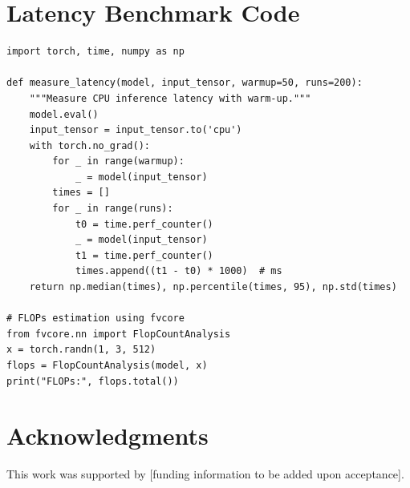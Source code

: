 \documentclass{article}
\begin{document}
\section{Latency Benchmark Code}
\label{app:latency_code}

\begin{verbatim}
import torch, time, numpy as np

def measure_latency(model, input_tensor, warmup=50, runs=200):
    """Measure CPU inference latency with warm-up."""
    model.eval()
    input_tensor = input_tensor.to('cpu')
    with torch.no_grad():
        for _ in range(warmup):
            _ = model(input_tensor)
        times = []
        for _ in range(runs):
            t0 = time.perf_counter()
            _ = model(input_tensor)
            t1 = time.perf_counter()
            times.append((t1 - t0) * 1000)  # ms
    return np.median(times), np.percentile(times, 95), np.std(times)

# FLOPs estimation using fvcore
from fvcore.nn import FlopCountAnalysis
x = torch.randn(1, 3, 512)
flops = FlopCountAnalysis(model, x)
print("FLOPs:", flops.total())
\end{verbatim}

\section*{Acknowledgments}
This work was supported by [funding information to be added upon acceptance].



\end{document}
